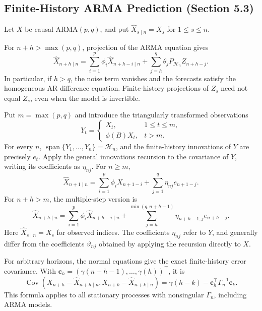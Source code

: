 \subsection{Finite-History ARMA Prediction (Section 5.3)}
Let $X$ be causal ARMA$(p,q)$, and put
$\widehat X_{s\mid n}=X_s$ for $1\le s\le n$.
\begin{proposition}
For $n+h>\max(p,q)$, projection of the ARMA equation gives
\[
\widehat X_{n+h\mid n}
=\sum_{i=1}^p\phi_i\widehat X_{n+h-i\mid n}
+\sum_{j=h}^q\theta_jP_{\mathcal H_n}Z_{n+h-j}.
\]
In particular, if $h>q$, the noise term vanishes and the forecasts satisfy
the homogeneous AR difference equation. Finite-history projections of
$Z_s$ need not equal $Z_s$, even when the model is invertible.
\end{proposition}
\begin{proposition}
Put $m=\max(p,q)$ and introduce the triangularly transformed observations
\[
Y_t=\begin{cases}X_t,&1\le t\le m,\\
\phi(B)X_t,&t>m.
\end{cases}
\]
For every $n$, $\operatorname{span}\{Y_1,\ldots,Y_n\}=\mathcal H_n$,
and the finite-history innovations of $Y$ are precisely $e_t$.
Apply the general innovations recursion to the covariance of $Y$, writing
its coefficients as $\eta_{nj}$. For $n\ge m$,
\[
\widehat X_{n+1\mid n}=\sum_{i=1}^p\phi_iX_{n+1-i}
+\sum_{j=1}^q\eta_{nj}e_{n+1-j}.
\]
For $n+h>m$, the multiple-step version is
\[
\widehat X_{n+h\mid n}=\sum_{i=1}^p\phi_i\widehat X_{n+h-i\mid n}
+\sum_{j=h}^{\min(q,n+h-1)}\eta_{n+h-1,j}e_{n+h-j}.
\]
Here $\widehat X_{s\mid n}=X_s$ for observed indices. The coefficients
$\eta_{nj}$ refer to $Y$, and generally differ from the coefficients
$\vartheta_{nj}$ obtained by applying the recursion directly to $X$.
\end{proposition}
For arbitrary horizons, the normal equations give the exact finite-history
error covariance. With
$\mathbf c_h=(\gamma(n+h-1),\ldots,\gamma(h))^\top$, it is
\[
\operatorname{Cov}(X_{n+h}-\widehat X_{n+h\mid n},
X_{n+k}-\widehat X_{n+k\mid n})
=\gamma(h-k)-\mathbf c_h^\top\Gamma_n^{-1}\mathbf c_k.
\]
This formula applies to all stationary processes with nonsingular
$\Gamma_n$, including ARMA models.

